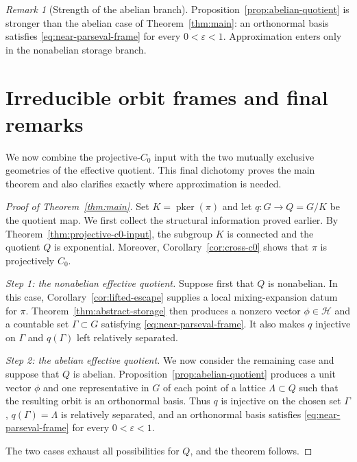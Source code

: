 \documentclass[reqno]{amsart}
\numberwithin{equation}{section}
\theoremstyle{definition}
\theoremstyle{remark}
\newtheorem{remark}[theorem]{Remark}
\newcommand{\cH}{\mathcal H}
\newcommand{\pker}{\operatorname{pker}}
\newcommand{\Step}[1]{\par\medskip\noindent\textit{#1.}\quad}
\begin{document}
\begin{remark}[Strength of the abelian branch]
Proposition~\ref{prop:abelian-quotient} is stronger than the abelian case of
Theorem~\ref{thm:main}: an orthonormal basis satisfies
\eqref{eq:near-parseval-frame} for every $0<\varepsilon<1$.  Approximation enters only
in the nonabelian storage branch.
\end{remark}

\section{Irreducible orbit frames and final remarks}
\label{sec:proof-main}

We now combine the projective-$C_0$ input with the two mutually exclusive
geometries of the effective quotient.  This final dichotomy proves the main
theorem and also clarifies exactly where approximation is needed.

\begin{proof}[Proof of Theorem~\ref{thm:main}]
Set $K=\pker(\pi)$ and let $q:G\to Q=G/K$ be the quotient map.  We first
collect the structural information proved earlier.  By
Theorem~\ref{thm:projective-c0-input}, the subgroup $K$ is connected and the
quotient $Q$ is exponential.  Moreover,
Corollary~\ref{cor:cross-c0} shows that $\pi$ is projectively $C_0$.

\Step{Step 1: the nonabelian effective quotient}
Suppose first that $Q$ is nonabelian.  In this case,
Corollary~\ref{cor:lifted-escape} supplies a
local mixing-expansion datum for $\pi$.  Theorem~\ref{thm:abstract-storage}
then produces a nonzero vector
$\phi\in\cH$ and a countable set $\Gamma\subset G$ satisfying
\eqref{eq:near-parseval-frame}.  It also makes $q$ injective on $\Gamma$ and
$q(\Gamma)$ left relatively separated.

\Step{Step 2: the abelian effective quotient}
We now consider the remaining case and suppose that $Q$ is abelian.
Proposition~\ref{prop:abelian-quotient}
produces a unit vector $\phi$ and one representative in $G$ of each point of
a lattice $\Lambda\subset Q$ such that the resulting orbit is an
orthonormal basis.  Thus $q$ is injective on the chosen set $\Gamma$,
$q(\Gamma)=\Lambda$ is relatively separated, and an orthonormal basis
satisfies \eqref{eq:near-parseval-frame} for every
$0<\varepsilon<1$.

The two cases exhaust all possibilities for $Q$, and the theorem follows.
\end{proof}
\end{document}
